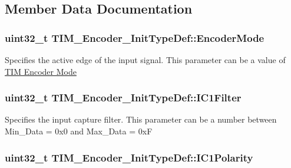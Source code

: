 \subsection{Member Data Documentation}
\hypertarget{struct_t_i_m___encoder___init_type_def_ab1e4b0752d88c04081e3ff2fea6aa52e}{
\subsubsection[{Encoder\-Mode}]{\setlength{\rightskip}{0pt plus 5cm}uint32\-\_\-t T\-I\-M\-\_\-\-Encoder\-\_\-\-Init\-Type\-Def\-::\-Encoder\-Mode}}\label{struct_t_i_m___encoder___init_type_def_ab1e4b0752d88c04081e3ff2fea6aa52e}
Specifies the active edge of the input signal. This parameter can be a value of \hyperlink{group___t_i_m___encoder___mode}{T\-I\-M Encoder Mode} \hypertarget{struct_t_i_m___encoder___init_type_def_a50f3051c1b568b9dcde146199f97f3fb}{
\subsubsection[{I\-C1\-Filter}]{\setlength{\rightskip}{0pt plus 5cm}uint32\-\_\-t T\-I\-M\-\_\-\-Encoder\-\_\-\-Init\-Type\-Def\-::\-I\-C1\-Filter}}\label{struct_t_i_m___encoder___init_type_def_a50f3051c1b568b9dcde146199f97f3fb}
Specifies the input capture filter. This parameter can be a number between Min\-\_\-\-Data = 0x0 and Max\-\_\-\-Data = 0x\-F \hypertarget{struct_t_i_m___encoder___init_type_def_a3e27323d593e4f3b95ebaa3772e79618}{
\subsubsection[{I\-C1\-Polarity}]{\setlength{\rightskip}{0pt plus 5cm}uint32\-\_\-t T\-I\-M\-\_\-\-Encoder\-\_\-\-Init\-Type\-Def\-::\-I\-C1\-Polarity}}\label{struct_t_i_m___encoder___init_type_def_a3e27323d593e4f3b95ebaa3772e79618}
